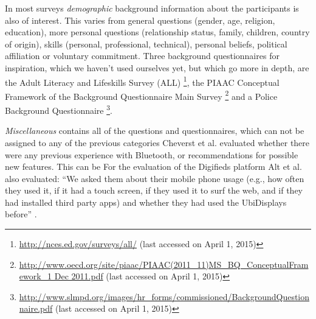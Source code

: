 	
		In most surveys \textit{demographic} background information about the participants is also of interest. This varies from general questions (gender, age, religion, education), more personal questions (relationship status, family, children, country of origin), skills (personal, professional, technical), personal beliefs, political affiliation or voluntary commitment.
		Three background questionnaires for inspiration, which we haven't used ourselves yet, but which go more in depth, are the Adult Literacy and Lifeskills Survey (ALL) \footnote{\url{http://nces.ed.gov/surveys/all/} (last accessed on April 1, 2015)}, the PIAAC Conceptual Framework of the Background Questionnaire Main Survey \footnote{\url{http://www.oecd.org/site/piaac/PIAAC(2011_11)MS_BQ_ConceptualFramework_1 Dec 2011.pdf} (last accessed on April 1, 2015)} and a Police Background Questionnaire \footnote{\url{http://www.slmpd.org/images/hr_forms/commissioned/BackgroundQuestionnaire.pdf} (last accessed on April 1, 2015)}.


		\textit{Miscellaneous} contains all of the questions and questionnaires, which can not be assigned to any of the previous categories 
		Cheverst et al. \cite{cheverst2005hermes} evaluated whether there were any previous experience with Bluetooth, or recommendations for possible new features. This can be 
		For the evaluation of the Digifieds platform Alt et al. also evaluated: ``We asked them about their mobile phone usage (e.g., how often they used it, if it had a touch screen, if they used it to surf the web, and if they had installed third party apps) and whether they had used the UbiDisplays before'' \cite{alt2011digifieds}.


